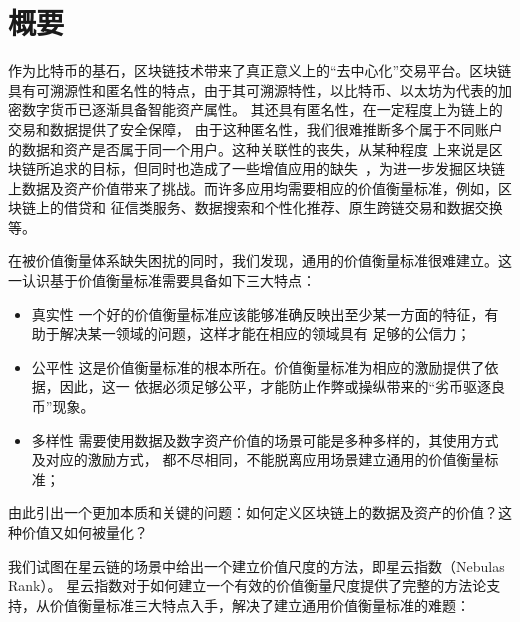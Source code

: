 
\section{概要}
作为比特币的基石，区块链技术带来了真正意义上的“去中心化”交易平台。区块链具有可溯源性和匿名性的特点，由于其可溯源特性，以比特币、以太坊为代表的加密数字货币已逐渐具备智能资产属性。
其还具有匿名性，在一定程度上为链上的交易和数据提供了安全保障，
由于这种匿名性，我们很难推断多个属于不同账户的数据和资产是否属于同一个用户。这种关联性的丧失，从某种程度
上来说是区块链所追求的目标，但同时也造成了一些增值应用的缺失~\cite{meiklejohn2013fistful}，为进一步发掘区块链上数据及资产价值带来了挑战。而许多应用均需要相应的价值衡量标准，例如，区块链上的借贷和
征信类服务、数据搜索和个性化推荐、原生跨链交易和数据交换等。



在被价值衡量体系缺失困扰的同时，我们发现，通用的价值衡量标准很难建立。这一认识基于价值衡量标准需要具备如下三大特点：

\begin{itemize}
\item{真实性} 一个好的价值衡量标准应该能够准确反映出至少某一方面的特征，有助于解决某一领域的问题，这样才能在相应的领域具有
足够的公信力；
\item{公平性} 这是价值衡量标准的根本所在。价值衡量标准为相应的激励提供了依据，因此，这一
依据必须足够公平，才能防止作弊或操纵带来的“劣币驱逐良币”现象。
\item{多样性} 需要使用数据及数字资产价值的场景可能是多种多样的，其使用方式及对应的激励方式，
都不尽相同，不能脱离应用场景建立通用的价值衡量标准；
\end{itemize}

由此引出一个更加本质和关键的问题：如何定义区块链上的数据及资产的价值？这种价值又如何被量化？


我们试图在星云链的场景中给出一个建立价值尺度的方法，即星云指数（Nebulas Rank）。
星云指数对于如何建立一个有效的价值衡量尺度提供了完整的方法论支持，从价值衡量标准三大特点入手，解决了建立通用价值衡量标准的难题：

